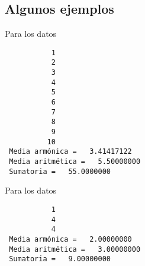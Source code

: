 \documentclass{article}
\begin{document}
\subsection{Algunos ejemplos}
Para los datos 
\begin{verbatim}
           1
           2
           3
           4
           5
           6
           7
           8
           9
          10
 Media armónica =   3.41417122    
 Media aritmética =   5.50000000    
 Sumatoria =   55.0000000    
\end{verbatim}
Para los datos
\begin{verbatim}
           1
           4
           4
 Media armónica =   2.00000000    
 Media aritmética =   3.00000000    
 Sumatoria =   9.00000000 
 \end{verbatim}
 
\end{document}
